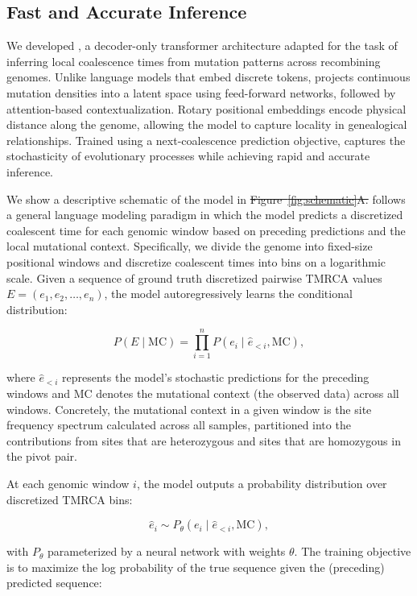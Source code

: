 \documentclass[9pt,twocolumn,twoside]{pnas-new} %
\makeatletter
\providecommand{\DIFadd}[1]{{\protect\color{blue}\uwave{#1}}} %
\providecommand{\DIFdel}[1]{{\protect\color{red}\sout{#1}}} %
\providecommand{\DIFaddbegin}{} %
\providecommand{\DIFaddend}{} %
\providecommand{\DIFdelbegin}{} %
\providecommand{\DIFdelend}{} %
\let\sout@orig\sout %
\renewcommand{\sout}[1]{\ifmmode\text{\sout@orig{\ensuremath{#1}}}\else\sout@orig{#1}\fi} %
\makeatother
\begin{document}
\DIFdelend \subsection*{Fast and Accurate Inference}

We developed \cxtkit, a decoder-only transformer architecture adapted for the task of inferring local coalescence times from mutation patterns across recombining genomes. Unlike 
language models that embed discrete tokens, \cxtkit projects continuous mutation densities into a latent space using feed-forward networks, followed by attention-based contextualization. Rotary positional embeddings encode physical distance along the genome, allowing the model to capture locality in genealogical relationships. Trained using a next-coalescence prediction objective, \cxtkit captures the stochasticity of evolutionary processes while achieving rapid and accurate inference.


We show a descriptive schematic of the model in \DIFdelbegin \DIFdel{Figure~\ref{fig:schematic}A.  
}\DIFdelend \DIFaddbegin \DIFadd{the left panel of Figure~1.  
}\DIFaddend \cxtkit follows a general language modeling paradigm in which the model predicts 
a discretized coalescent time for each genomic window based on preceding predictions 
and the local mutational context. Specifically, we divide the genome into fixed-size 
positional windows and discretize coalescent times into bins on a 
logarithmic scale. Given a sequence of ground truth discretized pairwise TMRCA values  
\( E = (e_1, e_2, \dots, e_n) \), the model autoregressively learns the conditional 
distribution:

\[
P(E \mid \text{MC}) = \prod_{i=1}^{n} P(e_i \mid \hat{e}_{<i}, \text{MC}),
\]

where \( \hat{e}_{<i} \) represents the model's stochastic predictions for the preceding windows and \( \text{MC} \) denotes the mutational context (the observed data) across all windows. Concretely, the mutational context in a given window is the site frequency spectrum calculated across all samples, partitioned into the contributions from sites that are heterozygous and sites that are homozygous in the pivot pair.

At each genomic window \( i \), the model outputs a probability distribution over 
discretized TMRCA bins:

\[
\hat{e}_i \sim P_\theta(e_i \mid \hat{e}_{<i}, \text{MC}),
\]

with \( P_\theta \) parameterized by a neural network with weights $\theta$. The training objective is to maximize the log probability of the true sequence given the (preceding) predicted sequence:
\end{document}
